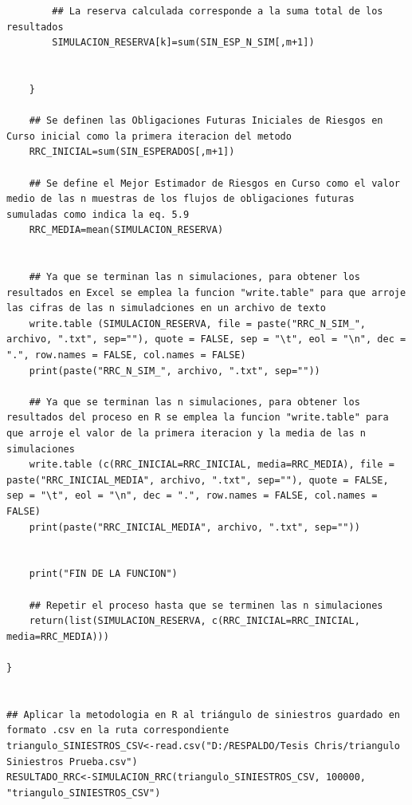 \documentclass[11pt,twoside,openright,spanish]{report}
\numberwithin{equation}{chapter}
\numberwithin{figure}{chapter}
\numberwithin{table}{chapter}
\begin{document}
\begin{lstlisting}
		## La reserva calculada corresponde a la suma total de los resultados
		SIMULACION_RESERVA[k]=sum(SIN_ESP_N_SIM[,m+1])
		
		
	}
	
	## Se definen las Obligaciones Futuras Iniciales de Riesgos en Curso inicial como la primera iteracion del metodo
	RRC_INICIAL=sum(SIN_ESPERADOS[,m+1])
	
	## Se define el Mejor Estimador de Riesgos en Curso como el valor medio de las n muestras de los flujos de obligaciones futuras sumuladas como indica la eq. 5.9
	RRC_MEDIA=mean(SIMULACION_RESERVA)
	
	
	## Ya que se terminan las n simulaciones, para obtener los resultados en Excel se emplea la funcion "write.table" para que arroje las cifras de las n simuladciones en un archivo de texto
	write.table (SIMULACION_RESERVA, file = paste("RRC_N_SIM_", archivo, ".txt", sep=""), quote = FALSE, sep = "\t", eol = "\n", dec = ".", row.names = FALSE, col.names = FALSE)
	print(paste("RRC_N_SIM_", archivo, ".txt", sep=""))
	
	## Ya que se terminan las n simulaciones, para obtener los resultados del proceso en R se emplea la funcion "write.table" para que arroje el valor de la primera iteracion y la media de las n simulaciones
	write.table (c(RRC_INICIAL=RRC_INICIAL, media=RRC_MEDIA), file = paste("RRC_INICIAL_MEDIA", archivo, ".txt", sep=""), quote = FALSE, sep = "\t", eol = "\n", dec = ".", row.names = FALSE, col.names = FALSE)
	print(paste("RRC_INICIAL_MEDIA", archivo, ".txt", sep=""))
	
	
	print("FIN DE LA FUNCION")
	
	## Repetir el proceso hasta que se terminen las n simulaciones
	return(list(SIMULACION_RESERVA, c(RRC_INICIAL=RRC_INICIAL, media=RRC_MEDIA)))
	
}


## Aplicar la metodologia en R al triángulo de siniestros guardado en formato .csv en la ruta correspondiente
triangulo_SINIESTROS_CSV<-read.csv("D:/RESPALDO/Tesis Chris/triangulo Siniestros Prueba.csv")
RESULTADO_RRC<-SIMULACION_RRC(triangulo_SINIESTROS_CSV, 100000, "triangulo_SINIESTROS_CSV")


\end{lstlisting}

	
	\pagestyle{empty}

	
\end{document}
